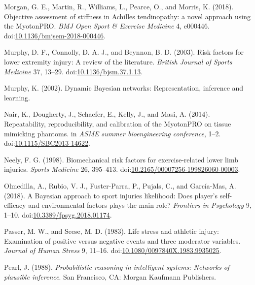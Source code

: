 \documentclass[utf8]{frontiersHLTH}
\begin{document}
\leavevmode\hypertarget{ref-Morgan2018}{}%
Morgan, G. E., Martin, R., Williams, L., Pearce, O., and Morris, K.
(2018). Objective assessment of stiffness in Achilles tendinopathy: a
novel approach using the MyotonPRO. \emph{BMJ Open Sport \& Exercise
Medicine} 4, e000446.
doi:\href{https://doi.org/10.1136/bmjsem-2018-000446}{10.1136/bmjsem-2018-000446}.

\leavevmode\hypertarget{ref-Murphy2003}{}%
Murphy, D. F., Connolly, D. A. J., and Beynnon, B. D. (2003). Risk
factors for lower extremity injury: A review of the literature.
\emph{British Journal of Sports Medicine} 37, 13--29.
doi:\href{https://doi.org/10.1136/bjsm.37.1.13}{10.1136/bjsm.37.1.13}.

\leavevmode\hypertarget{ref-Murphy2002}{}%
Murphy, K. (2002). Dynamic Bayesian networks: Representation, inference
and learning.

\leavevmode\hypertarget{ref-Nair2014}{}%
Nair, K., Dougherty, J., Schaefer, E., Kelly, J., and Masi, A. (2014).
Repeatability, reproducibility, and calibration of the MyotonPRO on
tissue mimicking phantoms. in \emph{ASME summer bioengineering
conference}, 1--2.
doi:\href{https://doi.org/10.1115/SBC2013-14622}{10.1115/SBC2013-14622}.

\leavevmode\hypertarget{ref-Neely1998}{}%
Neely, F. G. (1998). Biomechanical risk factors for exercise-related
lower limb injuries. \emph{Sports Medicine} 26, 395--413.
doi:\href{https://doi.org/10.2165/00007256-199826060-00003}{10.2165/00007256-199826060-00003}.

\leavevmode\hypertarget{ref-Olmedilla2018}{}%
Olmedilla, A., Rubio, V. J., Fuster-Parra, P., Pujals, C., and
García-Mas, A. (2018). A Bayesian approach to sport injuries likelihood:
Does player's self-efficacy and environmental factors plays the main
role? \emph{Frontiers in Psychology} 9, 1--10.
doi:\href{https://doi.org/10.3389/fpsyg.2018.01174}{10.3389/fpsyg.2018.01174}.

\leavevmode\hypertarget{ref-Passer1983a}{}%
Passer, M. W., and Seese, M. D. (1983). Life stress and athletic injury:
Examination of positive versus negative events and three moderator
variables. \emph{Journal of Human Stress} 9, 11--16.
doi:\href{https://doi.org/10.1080/0097840X.1983.9935025}{10.1080/0097840X.1983.9935025}.

\leavevmode\hypertarget{ref-Pearl1988}{}%
Pearl, J. (1988). \emph{Probabilistic reasoning in intelligent systems:
Networks of plausible inference}. San Francisco, CA: Morgan Kaufmann
Publishers.
\end{document}
